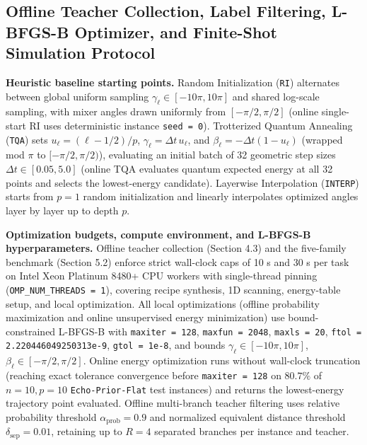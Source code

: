 \documentclass{article}
\theoremstyle{plain}
\theoremstyle{definition}
\begin{document}
\subsection{Offline Teacher Collection, Label Filtering, L-BFGS-B Optimizer, and Finite-Shot Simulation Protocol}\label{subsec:b_2}

\textbf{Heuristic baseline starting points.} Random Initialization (\texttt{RI}) alternates between global uniform sampling $\gamma_\ell\in[-10\pi,10\pi]$ and shared log-scale sampling, with mixer angles drawn uniformly from $[-\pi/2,\pi/2]$ (online single-start RI uses deterministic instance \texttt{seed = 0}). Trotterized Quantum Annealing (\texttt{TQA}) sets $u_\ell=(\ell-1/2)/p$, $\gamma_\ell=\Delta t\,u_\ell$, and $\beta_\ell=-\Delta t(1-u_\ell)$ (wrapped mod $\pi$ to $[-\pi/2,\pi/2)$), evaluating an initial batch of 32 geometric step sizes $\Delta t\in[0.05, 5.0]$ (online TQA evaluates quantum expected energy at all 32 points and selects the lowest-energy candidate). Layerwise Interpolation (\texttt{INTERP}) starts from $p=1$ random initialization and linearly interpolates optimized angles layer by layer up to depth $p$.

\textbf{Optimization budgets, compute environment, and L-BFGS-B hyperparameters.} Offline teacher collection (Section 4.3) and the five-family benchmark (Section 5.2) enforce strict wall-clock caps of 10 s and 30 s per task on Intel Xeon Platinum 8480+ CPU workers with single-thread pinning (\texttt{OMP\_\allowbreak{}NUM\_\allowbreak{}THREADS = 1}), covering recipe synthesis, 1D scanning, energy-table setup, and local optimization. All local optimizations (offline probability maximization and online unsupervised energy minimization) use bound-constrained L-BFGS-B \citep{byrd1995limited} with \texttt{maxiter = 128}, \texttt{maxfun = 2048}, \texttt{maxls = 20}, \texttt{ftol = 2.220446049250313e-9}, \texttt{gtol = 1e-8}, and bounds $\gamma_\ell\in[-10\pi,10\pi]$, $\beta_\ell\in[-\pi/2,\pi/2]$. Online energy optimization runs without wall-clock truncation (reaching exact tolerance convergence before \texttt{maxiter = 128} on $80.7\%$ of $n=10, p=10$ \texttt{Echo-Prior-Flat} test instances) and returns the lowest-energy trajectory point evaluated. Offline multi-branch teacher filtering uses relative probability threshold $\alpha_{\mathrm{prob}}=0.9$ and normalized equivalent distance threshold $\delta_{\mathrm{sep}}=0.01$, retaining up to $R=4$ separated branches per instance and teacher.
\end{document}
